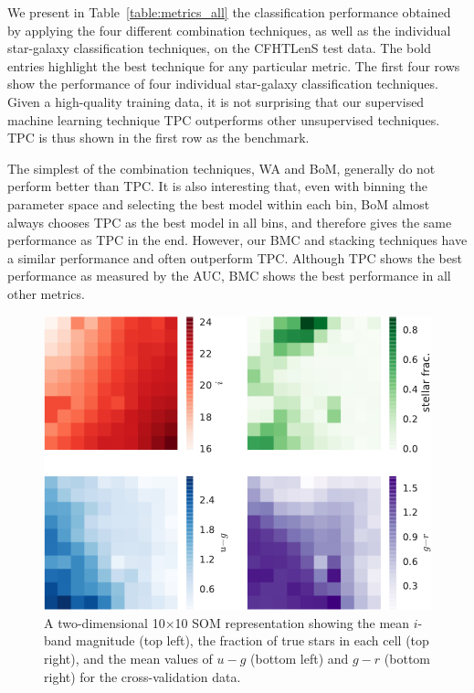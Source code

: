 \documentclass[useAMS,usenatbib]{mn2e}
\begin{document}
We present in Table~\ref{table:metrics_all}
the classification performance obtained by
applying the four different combination techniques,
as well as the individual star-galaxy classification techniques,
on the CFHTLenS test data.
The bold entries highlight the best technique for any particular metric.
The first four rows show the performance of four individual star-galaxy
classification techniques.
Given a high-quality training data, it is not surprising that 
our supervised machine learning technique TPC
outperforms other unsupervised techniques.
TPC is thus shown in the first row as the benchmark.

The simplest of the combination techniques, WA and BoM,
generally do not perform better than TPC.
It is also interesting that,
even with binning the parameter space and selecting the best model
within each bin,
BoM almost always chooses TPC as the best model in all bins,
and therefore gives the same performance as TPC in the end.
However, our BMC and stacking techniques have a similar performance
and often outperform TPC.
Although TPC shows the best performance as measured by the AUC,
BMC shows the best performance in all other metrics.

\begin{figure}
  \centering
  \includegraphics[width=\columnwidth]{figures/som_colors.pdf}
  \caption{A two-dimensional 10$\times$10 SOM representation
           showing the mean $i$-band magnitude (top left),
           the fraction of true stars in each cell (top right),
           and the mean values of $u-g$ (bottom left) and $g-r$ (bottom right)
           for the cross-validation data.}
  \label{fig:som_colors}
\end{figure}
\end{document}
